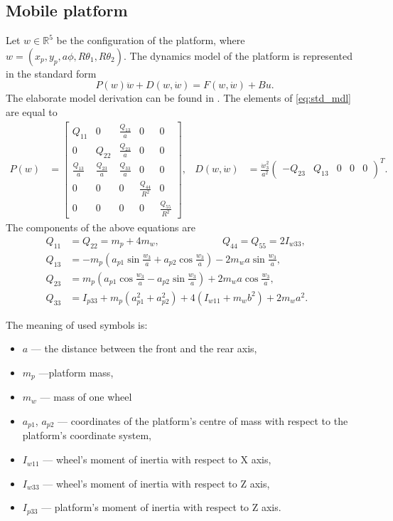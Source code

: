 \subsection{Mobile platform}
Let $w\in \mathbb{R}^5$ be the configuration of the platform, where
$w=(x_p, y_p, a\phi, R\theta_1, R\theta_2)$.  
The dynamics model of the platform is represented in the standard form
\begin{equation}
\label{eq:std_mdl}
P(w)\ddot w + D(w, \dot w) = F(w, \dot w) + Bu.
\end{equation}
The elaborate model derivation can be found in \cite{coupled}. 
The elements of \eqref{eq:std_mdl} are equal to
\begin{align}
P(w) &= \begin{bmatrix}
Q_{11} & 0 & \frac{Q_{13}}{a} & 0 & 0\\
0 & Q_{22} & \frac{Q_{23}}{a} & 0 & 0\\
\frac{Q_{13}}{a} & \frac{Q_{23}}{a} & \frac{Q_{33}}{a} & 0 & 0\\
0 & 0 & 0 & \frac{Q_{44}}{R^2} & 0 \\
0 & 0 & 0 & 0 & \frac{Q_{55}}{R^2}
\end{bmatrix}, & 
D(w, \dot w) &= \frac{\dot w_3^2}{a^2}\begin{pmatrix}
-Q_{23} & Q_{13} & 0 & 0 & 0
\end{pmatrix}^T.
\end{align}
The components of the above equations are
\begin{align}
Q_{11} &= Q_{22} = m_p+4m_w, \phantom{xxxxxxxxxxx} Q_{44} = Q_{55} = 2I_{w33},\\
Q_{13} &= -m_p(a_{p1}\sin\frac{w_3}{a}+a_{p2}\cos\frac{w_3}{a})- 2m_wa\sin\frac{w_3}{a}, & &\\
Q_{23} &=  m_p(a_{p1}\cos\frac{w_3}{a}-a_{p2}\sin\frac{w_3}{a})+ 2m_wa\cos\frac{w_3}{a}, & &\\
Q_{33} &= I_{p33}+m_p(a_{p1}^2+a_{p2}^2)+4(I_{w11}+m_wb^2)+2m_wa^2.
\end{align}

The meaning of used symbols is:
\begin{itemize}
\item $a$ --- the distance between the front and the rear axis,
\item $m_p$ ---platform mass,
\item $m_w$ --- mass of one wheel
\item $a_{p1}$, $a_{p2}$ --- coordinates of the platform's centre of mass with
respect to the platform's coordinate system,
\item $I_{w11}$ --- wheel's moment of inertia with respect to X axis,
\item $I_{w33}$ --- wheel's moment of inertia with respect to Z axis,
\item $I_{p33}$ --- platform's moment of inertia with respect to Z axis.

\end{itemize}

